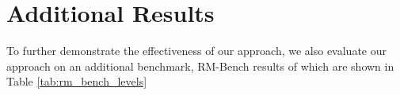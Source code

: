 \section{Additional Results}
\label{All Results}
To further demonstrate the effectiveness of our approach, we also evaluate our approach on an additional benchmark, RM-Bench results of which are shown in Table \ref{tab:rm_bench_levels} 